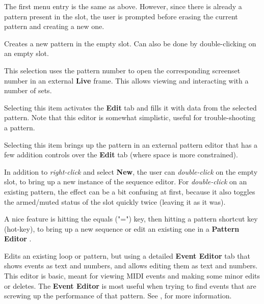    The first menu entry is the same as above.  However, since there is
   already a pattern present in the slot, the user is prompted before erasing
   the current pattern and creating a new one.

   \setcounter{ItemCounter}{0}      %

   Creates a new pattern in the empty slot.
   Can also be done by double-clicking on an empty slot.

   This selection uses the pattern number to open the corresponding screenset
   number in an external \textbf{Live} frame.
   This allows viewing and interacting with a number of sets.

   Selecting this item activates the \textbf{Edit} tab and fills it with data
   from the selected pattern.
   Note that this editor is somewhat simplistic, useful for trouble-shooting a
   pattern.

   Selecting this item brings up the pattern in an external pattern editor that
   has a few addition controls over the \textbf{Edit} tab (where space is more
   constrained).

   In addition to \textsl{right-click} and select \textbf{New}, the user can
   \textsl{double-click} on the empty slot,
   to bring up a new instance of the sequence
   editor.  For \textsl{double-click} on an existing pattern,
   the effect can be a bit confusing at first,
   because it also toggles the armed/muted status of the slot
   quickly twice (leaving it as it was).


   A nice feature is hitting the equals ("=") key, then hitting
   a pattern shortcut key (hot-key), to bring up a new sequence or edit an
   existing one in a \textbf{Pattern Editor} .

   Edits an existing loop or pattern, but using a detailed \textbf{Event Editor}
   tab that shows events as text and numbers, and allows editing them as text
   and numbers.
   This editor is basic, meant for viewing
   MIDI events and making some minor edits or deletes.
   The \textbf{Event Editor} is most useful when trying to find events
   that are screwing up the performance of that pattern.
   See , for more information.

